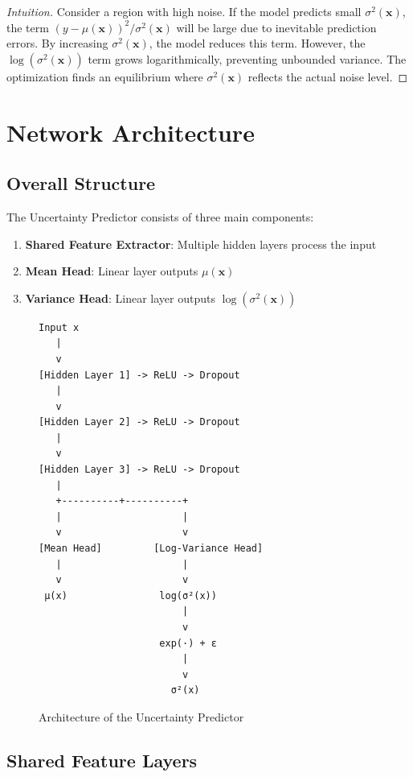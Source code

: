 \documentclass[11pt,a4paper]{article}
\begin{document}
\begin{proof}[Intuition]
Consider a region with high noise. If the model predicts small $\sigma^2(\mathbf{x})$, the term $(y - \mu(\mathbf{x}))^2/\sigma^2(\mathbf{x})$ will be large due to inevitable prediction errors. By increasing $\sigma^2(\mathbf{x})$, the model reduces this term. However, the $\log(\sigma^2(\mathbf{x}))$ term grows logarithmically, preventing unbounded variance. The optimization finds an equilibrium where $\sigma^2(\mathbf{x})$ reflects the actual noise level.
\end{proof}

\section{Network Architecture}

\subsection{Overall Structure}

The Uncertainty Predictor consists of three main components:

\begin{enumerate}
    \item \textbf{Shared Feature Extractor}: Multiple hidden layers process the input
    \item \textbf{Mean Head}: Linear layer outputs $\mu(\mathbf{x})$
    \item \textbf{Variance Head}: Linear layer outputs $\log(\sigma^2(\mathbf{x}))$
\end{enumerate}

\begin{figure}[h]
\centering
\begin{verbatim}
Input x
   |
   v
[Hidden Layer 1] -> ReLU -> Dropout
   |
   v
[Hidden Layer 2] -> ReLU -> Dropout
   |
   v
[Hidden Layer 3] -> ReLU -> Dropout
   |
   +----------+----------+
   |                     |
   v                     v
[Mean Head]         [Log-Variance Head]
   |                     |
   v                     v
 μ(x)                log(σ²(x))
                         |
                         v
                     exp(·) + ε
                         |
                         v
                       σ²(x)
\end{verbatim}
\caption{Architecture of the Uncertainty Predictor}
\end{figure}

\subsection{Shared Feature Layers}
\end{document}
